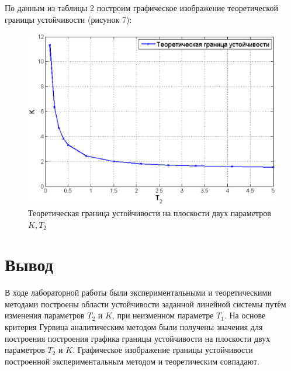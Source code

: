 \documentclass[12pt,a4paper]{article}
\begin{document}
По данным из таблицы 2 построим графическое изображение теоретической границы устойчивости (рисунок 7):
\begin{figure}[H]
	\centering
	\includegraphics[width=0.9\linewidth]{teor-gr.eps}
	\caption{Теоретическая граница устойчивости на плоскости двух параметров $K, T_2$}
\end{figure}

\newpage
\section*{Вывод}
В ходе лабораторной работы были экспериментальными и теоретическими методами построены области устойчивости заданной линейной системы путём изменения параметров $T_2$ и $K$, при неизменном параметре $T_1$. На основе критерия Гурвица аналитическим методом были получены значения для построения построения графика границы устойчивости на плоскости двух параметров $T_2$ и $K$. Графическое изображение границы устойчивости построенной экспериментальным методом и теоретическим совпадают.
\end{document}
